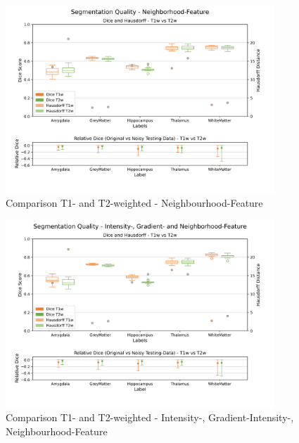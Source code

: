 \documentclass[conference]{IEEEtran}
\begin{document}
\begin{appendices}
\begin{figure}[h!]
    \centering
    \includegraphics[width=0.9\textwidth, trim={0 15mm 0 10mm}, clip]{images/03_T1W_C_NH_and_07_T2W_C_NH.png}
    \caption{Comparison T1- and T2-weighted - Neighbourhood-Feature}
    \label{fig:03_T1W_C_NH_and_07_T2W_C_NH}
\end{figure}
\begin{figure}[h!]
    \centering
    \includegraphics[width=0.9\textwidth, trim={0 15mm 0 10mm}, clip]{images/04_T1W_C_I_G_NH_and_08_T2W_C_I_G_NH.png}
    \caption{Comparison T1- and T2-weighted - Intensity-, Gradient-Intensity-, Neighbourhood-Feature}
    \label{fig:04_T1W_C_I_G_NH_and_08_T2W_C_I_G_NH}
\end{figure}


\end{appendices}
\end{document}
